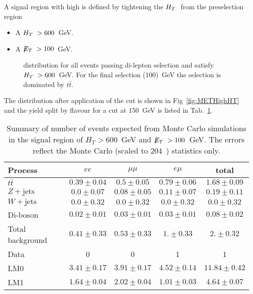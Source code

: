 A signal region with high \HT is defined by tightening the $H_T~$ 
from the preselection region
\begin{itemize}
\item A $H_T~>600$~GeV.
\item A $\displaystyle{\not} E_T~>100$~GeV.
\end{itemize}

\begin{figure}[hbtp]
  \hfill
  \caption{\MET distribution for all events passing di-lepton selection and satisfy $H_T~> 600$~GeV. For the final \MET selection (100)~GeV the selection is dominated by $t\bar{t}$.}
\end{figure}

The \MET distribution after application of the \HT
cut is shown in Fig~\ref{fig:METHighHT} and
the yield split by flavour for a cut at 150~GeV is listed in Tab.~\ref{tab:HighHT}.

\begin{table}[htb]
\begin{center}
\caption{\label{tab:HighHT}\protect Summary of number of events expected from Monte Carlo simulations in 
the signal region of $H_T> 600$~GeV and $\displaystyle{\not} E_T~> 100$~GeV. The errors reflect the Monte Carlo (scaled
    to 204~\pbi) statistics only.}
\begin{tabular}{l|ccc|c}
\hline
Process           & $ee$       & $\mu\mu$     & $e\mu$   & total   \\
\hline\hline
$t\bar{t}$       &$0.39 \pm 0.04$&$0.5 \pm 0.05$&$0.79 \pm 0.06$&$1.68 \pm 0.09$\\
$Z+\textrm{jets}$  &$0.0 \pm 0.07$&$0.08 \pm 0.05$&$0.11 \pm 0.07$&$0.19 \pm 0.11$\\
$W+\textrm{jets}$  &$0.0 \pm 0.32$&$0.0 \pm 0.32$&$0.0 \pm 0.32$&$0.0 \pm 0.32$\\
Di-boson          & $0.02 \pm 0.01$&$0.03 \pm 0.01$&$0.03 \pm 0.01$ & $0.08\pm 0.02$ \\
\hline
Total background  &$0.41 \pm 0.33$&$0.53 \pm 0.33$&$1. \pm 0.33$&$2. \pm 0.32$\\
\hline
Data  & 0 & 0 & 1 & 1 \\
\hline\hline
LM0               &$3.41 \pm 0.17$&$3.91 \pm 0.17$&$4.52 \pm 0.14$&$11.84 \pm 0.42$ \\
LM1               &$1.64 \pm 0.04$&$2.02 \pm 0.04$&$1.01 \pm 0.03$&$4.64 \pm 0.07$ \\
\hline
\end{tabular}
\end{center}
\end{table}


